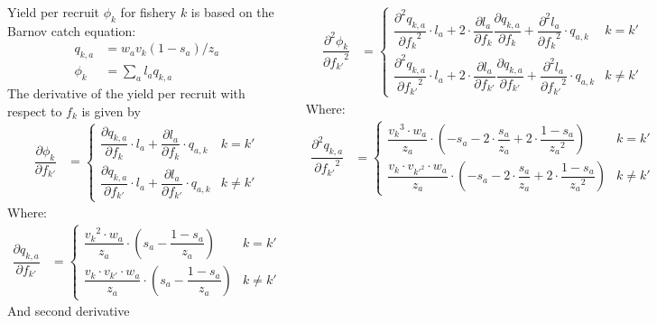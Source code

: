 \documentclass[20pt, a0paper, landscape,colspace=1cm]{tikzposter}
\newcommand{\dphip}  { \dfrac{{\partial \phi_{k}}}{{\partial f_{k'}}} }%
\newcommand{\dqak}   { \dfrac{{\partial q_{k,a}}}{{\partial f_k}} }
\newcommand{\dqakp}   { \dfrac{{\partial q_{k,a}}}{{\partial f_{k'}}} }
\newcommand{\dla}    { \dfrac{{\partial l_a}} {{\partial f_k}}}%
\newcommand{\dlap}    { \dfrac{{\partial l_a}} {{\partial f_{k'}}}}%
\newcommand{\ddla}   { \dfrac{{\partial^2 l_a}} {{\partial f_k}^2} }%
\newcommand{\ddlap}   { \dfrac{{\partial^2 l_a}} {{\partial f_{k'}}^2} }%
\newcommand{\ddphip}  { \dfrac{{\partial^2 \phi_k}}{{\partial f_{k'}}^2} }%
\newcommand{\ddqak}   { \dfrac{{\partial^2 q_{k,a}}}{{\partial f_k}^2} }
\newcommand{\ddqakp}   { \dfrac{{\partial^2 q_{k,a}}}{{\partial f_{k'}}^2} }
\begin{document}
\begin{columns}
{		Yield per recruit $\phi_k$ for fishery $k$ is based on the Barnov catch equation:
		\begin{align}
			q_{k,a} &= w_a v_k (1-s_a)/ z_a \nonumber \\
			\phi_k &= \sum_a l_a q_{k,a} \label{eq.15}
		\end{align}
		The derivative of the yield per recruit with respect to $f_k$ is given by
		\begin{align}
		\dphip &=
			\begin{cases}
				 \dqak \cdot l_a + \dla \cdot q_{a,k} & k = k'\\
				 \dqakp \cdot l_a + \dlap \cdot q_{a,k} & k \neq k'
			\end{cases}
		\end{align}
		Where:
		\begin{align}
		\dqakp &=
			\begin{cases}
				 \dfrac{{v_k}^{2} \cdot w_a}{z_a} \cdot \left( s_a- \dfrac{1-s_a}{z_a}\right) & k = k' \\
				\dfrac{{v_k}\cdot v_{k'} \cdot w_a}{z_a} \cdot \left( s_a- \dfrac{1-s_a}{z_a}\right) & k \neq k'
			\end{cases}
		\end{align}
		And second derivative

		\begin{align}
		\ddphip &=
			\begin{cases}
				 \ddqak \cdot l_a + 2 \cdot \dla \dqak + \ddla \cdot q_{a,k} & k = k'\\
				 \ddqakp \cdot l_a + 2 \cdot \dlap \dqakp + \ddlap \cdot q_{a,k} & k \neq k'
			\end{cases}
		\end{align}
		Where:
		\begin{align}
		\ddqakp &=
			\begin{cases}
				 \dfrac{{v_k}^{3} \cdot w_a}{z_a} \cdot \left( - s_a - 2 \cdot \dfrac{s_a}{z_a}+ 2 \cdot \dfrac{1-s_a}{{z_a}^2}\right) & k = k' \\
				\dfrac{{v_k}\cdot v_{k'^2} \cdot w_a}{z_a} \cdot \left( - s_a - 2 \cdot \dfrac{s_a}{z_a}+ 2 \cdot \dfrac{1-s_a}{{z_a}^2}\right) &  k \neq k'
			\end{cases}
		\end{align}
		
	}
	
\end{columns}
\end{document}
